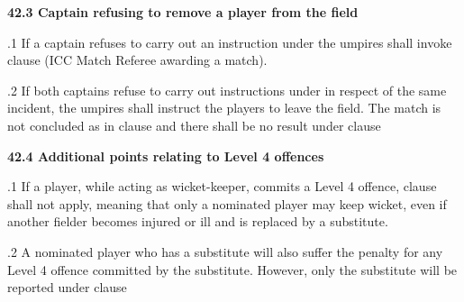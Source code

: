 \documentclass[12pt]{article}
\begin{document}
\vspace{\baselineskip}
{\fontsize{11pt}{13.2pt}\selectfont \textbf{42.3 \tabto{0.47in} Captain refusing to remove a player from the field}\par}\par


\vspace{\baselineskip}
\begin{adjustwidth}{0.5in}{0.29in}
{\fontsize{9pt}{10.8pt}.1 \tabto{0.49in} If a captain refuses to carry out an instruction under the umpires shall invoke clause (ICC Match Referee awarding a match).\par}\par

\end{adjustwidth}


\vspace{\baselineskip}
\begin{adjustwidth}{0.5in}{0.11in}
\begin{justify}
{\fontsize{9pt}{10.8pt}.2 \tabto{0.49in} If both captains refuse to carry out instructions under in respect of the same incident, the umpires shall instruct the players to leave the field. The match is not concluded as in clause and there shall be no result under clause \par}
\end{justify}\par

\end{adjustwidth}


\vspace{\baselineskip}
{\fontsize{11pt}{13.2pt}\selectfont \textbf{42.4 \tabto{0.47in} Additional points relating to Level 4 offences}\par}\par


\vspace{\baselineskip}
\begin{adjustwidth}{0.5in}{0.04in}
{\fontsize{9pt}{10.8pt}.1 \tabto{0.49in} If a player, while acting as wicket-keeper, commits a Level 4 offence, clause shall not apply, meaning that only a nominated player may keep wicket, even if another fielder becomes injured or ill and is replaced by a substitute.\par}\par

\end{adjustwidth}


\vspace{\baselineskip}
\begin{adjustwidth}{0.5in}{0.21in}
{\fontsize{9pt}{10.8pt}.2 \tabto{0.49in} A nominated player who has a substitute will also suffer the penalty for any Level 4 offence committed by the substitute. However, only the substitute will be reported under clause \par}\par

\end{adjustwidth}
\end{document}
